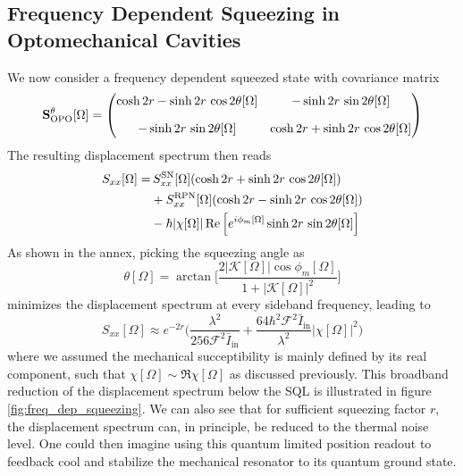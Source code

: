\subsection{Frequency Dependent Squeezing in Optomechanical Cavities}
We now consider a frequency dependent squeezed state with covariance matrix
\begin{equation*}
      \mathbf{S}^{\theta}_{\rm OPO}[\Omega] =\begin{pmatrix}
         \cosh 2r  - \sinh 2r \, \cos 2\theta[\Omega]  & -\sinh 2r \, \sin 2\theta[\Omega]  \\[10pt]
        -\sinh 2r \, \sin 2\theta[\Omega]  & \cosh 2r  + \sinh 2r \, \cos 2\theta[\Omega] 
      \end{pmatrix}
\end{equation*}
The resulting displacement spectrum then reads
\begin{equation}
  \begin{split}
      S_{xx}[\Omega] = & \, S_{xx}^{\rm SN}[\Omega] (\cosh 2r  + \sinh 2r \, \cos 2\theta[\Omega])\\
      & +  S_{xx}^{\rm RPN}[\Omega]( \cosh 2r  - \sinh 2r \, \cos 2\theta[\Omega]) \\
      & - \hbar |\chi[\Omega]| \Re\Big[  e^{i\phi_m[\Omega]}\sinh 2r \, \sin 2\theta[\Omega]\Big]
  \end{split}
\end{equation}
As shown in the annex, picking the squeezing angle as
\begin{equation}
  \theta[\Omega] = \arctan \Big[\dfrac{2|\mathcal{K}[\Omega]|\cos \phi_m[\Omega]}{1 + |\mathcal{K}[\Omega]|^2}\Big]
\end{equation}
minimizes the displacement spectrum at every sideband frequency, leading to
\begin{equation}
  S_{xx}[\Omega] \approx e^{-2r} \Big(\dfrac{\lambda^2}{256 \mathcal{F}^2 \bar{I}_\mathrm{in}} +  \dfrac{64 \hbar^2 \mathcal{F}^2 \bar{I}_\mathrm{in}}{\lambda^2}|\chi[\Omega]|^2\Big) 
\end{equation}
where we assumed the mechanical succeptibility is mainly defined by its real component, such that $\chi[\Omega] \sim \Re \chi[\Omega]$ as discussed previously.
This broadband reduction of the displacement spectrum below the SQL is illustrated in figure \ref{fig:freq_dep_squeezing}. We can also see that for sufficient squeezing factor $r$, the displacement spectrum can, in principle, be reduced to the thermal noise level. One could then imagine using this quantum limited position readout to feedback cool and stabilize the mechanical resonator to its quantum ground state. \\ 

